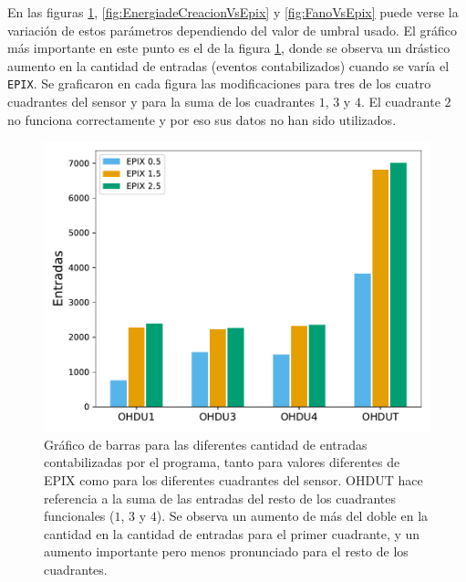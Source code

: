 \indent En las figuras \ref{fig:EntradasVsEpix}, \ref{fig:EnergiadeCreacionVsEpix} y \ref{fig:FanoVsEpix}  puede verse la variación de estos parámetros dependiendo del valor de umbral usado. El gráfico más importante en este punto es el de la figura \ref{fig:EntradasVsEpix}, donde se observa un drástico aumento en la cantidad de entradas (eventos contabilizados) cuando se varía el \verb|EPIX|. Se graficaron en cada figura las modificaciones para tres de los cuatro cuadrantes del sensor y para la suma de los cuadrantes $1$, $3$ y $4$. El cuadrante $2$ no funciona correctamente y por eso sus datos no han sido utilizados.
\begin{figure}[h]
    \centering
    \includegraphics[scale=0.5]{Figs/Entradas_vs_Epix.pdf}
    \caption{\footnotesize{Gráfico de barras para las diferentes cantidad de entradas contabilizadas por el programa, tanto para valores diferentes de EPIX como para los diferentes cuadrantes del sensor. OHDUT hace referencia a la suma de las entradas del resto de los cuadrantes funcionales ($1$, $3$ y $4$). Se observa un aumento de más del doble en la cantidad en la cantidad de entradas para el primer cuadrante, y un aumento importante pero menos pronunciado para el resto de los cuadrantes.}}
    \label{fig:EntradasVsEpix}
\end{figure}
